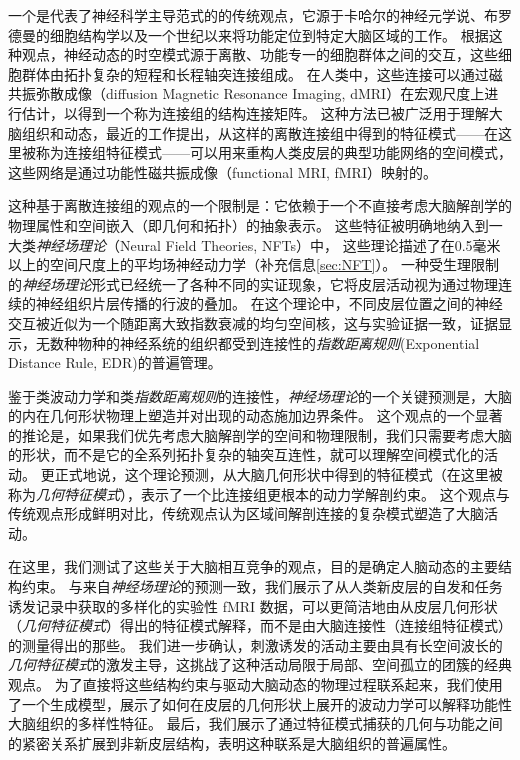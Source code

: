 \documentclass[lang=cn,a4paper,newtx]{elegantpaper}
\begin{document}
一个是代表了神经科学主导范式的的传统观点，它源于卡哈尔的神经元学说、布罗德曼的细胞结构学以及一个世纪以来将功能定位到特定大脑区域的工作。
根据这种观点，神经动态的时空模式源于离散、功能专一的细胞群体之间的交互，这些细胞群体由拓扑复杂的短程和长程轴突连接组成。
在人类中，这些连接可以通过磁共振弥散成像（diffusion Magnetic Resonance Imaging, dMRI）在宏观尺度上进行估计，以得到一个称为连接组的结构连接矩阵。
这种方法已被广泛用于理解大脑组织和动态，最近的工作提出，从这样的离散连接组中得到的特征模式——在这里被称为连接组特征模式——可以用来重构人类皮层的典型功能网络的空间模式，这些网络是通过功能性磁共振成像（functional MRI, fMRI）映射的。


这种基于离散连接组的观点的一个限制是：它依赖于一个不直接考虑大脑解剖学的物理属性和空间嵌入（即几何和拓扑）的抽象表示。
这些特征被明确地纳入到一大类\textit{神经场理论}（Neural Field Theories, NFTs）中，
这些理论描述了在0.5毫米以上的空间尺度上的平均场神经动力学（补充信息\ref{sec:NFT}）。
一种受生理限制的\textit{神经场理论}形式已经统一了各种不同的实证现象，它将皮层活动视为通过物理连续的神经组织片层传播的行波的叠加。
在这个理论中，不同皮层位置之间的神经交互被近似为一个随距离大致指数衰减的均匀空间核，这与实验证据一致，证据显示，无数种物种的神经系统的组织都受到连接性的\textit{指数距离规则}(Exponential Distance Rule, EDR)的普遍管理。


鉴于类波动力学和类\textit{指数距离规则}的连接性，\textit{神经场理论}的一个关键预测是，大脑的内在几何形状物理上塑造并对出现的动态施加边界条件。
这个观点的一个显著的推论是，如果我们优先考虑大脑解剖学的空间和物理限制，我们只需要考虑大脑的形状，而不是它的全系列拓扑复杂的轴突互连性，就可以理解空间模式化的活动。
更正式地说，这个理论预测，从大脑几何形状中得到的特征模式（在这里被称为\textit{几何特征模式}），表示了一个比连接组更根本的动力学解剖约束。
这个观点与传统观点形成鲜明对比，传统观点认为区域间解剖连接的复杂模式塑造了大脑活动。


在这里，我们测试了这些关于大脑相互竞争的观点，目的是确定人脑动态的主要结构约束。
与来自\textit{神经场理论}的预测一致，我们展示了从人类新皮层的自发和任务诱发记录中获取的多样化的实验性 fMRI 数据，可以更简洁地由从皮层几何形状（\textit{几何特征模式}）得出的特征模式解释，而不是由大脑连接性（连接组特征模式）的测量得出的那些。
我们进一步确认，刺激诱发的活动主要由具有长空间波长的\textit{几何特征模式}的激发主导，这挑战了这种活动局限于局部、空间孤立的团簇的经典观点。
为了直接将这些结构约束与驱动大脑动态的物理过程联系起来，我们使用了一个生成模型，展示了如何在皮层的几何形状上展开的波动力学可以解释功能性大脑组织的多样性特征。
最后，我们展示了通过特征模式捕获的几何与功能之间的紧密关系扩展到非新皮层结构，表明这种联系是大脑组织的普遍属性。
\end{document}
